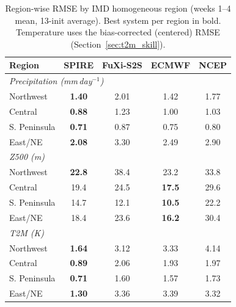 \documentclass[11pt]{article}
\begin{document}
\begin{table}[t]\centering
\caption{Region-wise RMSE by IMD homogeneous region (weeks 1--4 mean, 13-init average). Best system per region in bold. Temperature uses the bias-corrected (centered) RMSE (Section~\ref{sec:t2m_skill}).}\label{tab:reg_rmse}
\begin{tabular}{lcccc}\toprule
Region & SPIRE & FuXi-S2S & ECMWF & NCEP \\
\midrule
\multicolumn{5}{l}{\emph{Precipitation (mm\,day$^{-1}$)}}\\
Northwest     & \textbf{1.40} & 2.01 & 1.42 & 1.77 \\
Central       & \textbf{0.88} & 1.23 & 1.00 & 1.03 \\
S. Peninsula  & \textbf{0.71} & 0.87 & 0.75 & 0.80 \\
East/NE       & \textbf{2.08} & 3.30 & 2.49 & 2.90 \\
\midrule
\multicolumn{5}{l}{\emph{Z500 (m)}}\\
Northwest     & \textbf{22.8} & 38.4 & 23.2 & 33.8 \\
Central       & 19.4 & 24.5 & \textbf{17.5} & 29.6 \\
S. Peninsula  & 14.7 & 12.1 & \textbf{10.5} & 22.2 \\
East/NE       & 18.4 & 23.6 & \textbf{16.2} & 30.4 \\
\midrule
\multicolumn{5}{l}{\emph{T2M (K)}}\\
Northwest     & \textbf{1.64} & 3.12 & 3.33 & 4.14 \\
Central       & \textbf{0.89} & 2.06 & 1.93 & 1.97 \\
S. Peninsula  & \textbf{0.71} & 1.60 & 1.57 & 1.73 \\
East/NE       & \textbf{1.30} & 3.36 & 3.39 & 3.32 \\
\bottomrule\end{tabular}\end{table}
\end{document}
